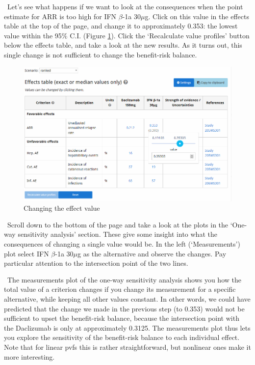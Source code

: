 \documentclass[00_mcda_tutorial.tex]{subfiles}
\begin{document}
\noindent \leftpointright \, Let’s see what happens if we want to look at the consequences when the point estimate for ARR is too high for IFN $\beta$-1a 30$\mu$g. Click on this value in the effects table at the top of the page, and change it to approximately 0.353: the lowest value within the 95\% C.I. (Figure \ref{fig:changeARR}). Click the ‘Recalculate value profiles’ button below the effects table, and take a look at the new results. As it turns out, this single change is not sufficient to change the benefit-risk balance.
\newline

\begin{figure}[!h]
    \centering
	\includegraphics[width=\textwidth]{fig/changeARR.png}
    \caption{Changing the effect value}
	\label{fig:changeARR}
\end{figure}

\noindent \leftpointright \, Scroll down to the bottom of the page and take a look at the plots in the ‘One-way sensitivity analysis’ section. These give some insight into what the consequences of changing a single value would be. In the left (‘Measurements’) plot select IFN $\beta$-1a 30$\mu$g as the alternative and observe the changes. Pay particular attention to the intersection point of the two lines.
\newline

\noindent \faGraduationCap \, The measurements plot of the one-way sensitivity analysis shows you how the total value of a criterion changes if you change its measurement for a specific alternative, while keeping all other values constant. In other words, we could have predicted that the change we made in the previous step (to 0.353) would not be sufficient to upset the benefit-risk balance, because the intersection point with the Daclizumab is only at approximately 0.3125. The measurements plot thus lets you explore the sensitivity of the benefit-risk balance to each individual effect. Note that for linear pvfs this is rather straightforward, but nonlinear ones make it more interesting.
\newline
\end{document}
